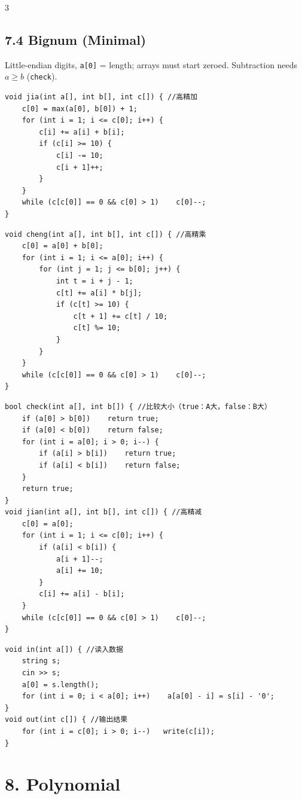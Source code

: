 \documentclass[8pt]{extarticle}
\begin{document}
\begin{multicols*}{3}
\subsection*{7.4 Bignum (Minimal)}

Little-endian digits, \texttt{a[0]} = length; arrays must start zeroed. Subtraction needs $a \ge b$ (\texttt{check}).


\begin{lstlisting}
void jia(int a[], int b[], int c[]) { //高精加
    c[0] = max(a[0], b[0]) + 1;
    for (int i = 1; i <= c[0]; i++) {
        c[i] += a[i] + b[i];
        if (c[i] >= 10) {
            c[i] -= 10;
            c[i + 1]++;
        }
    }
    while (c[c[0]] == 0 && c[0] > 1)    c[0]--;
}
\end{lstlisting}

\begin{lstlisting}
void cheng(int a[], int b[], int c[]) { //高精乘
    c[0] = a[0] + b[0];
    for (int i = 1; i <= a[0]; i++) {
        for (int j = 1; j <= b[0]; j++) {
            int t = i + j - 1;
            c[t] += a[i] * b[j];
            if (c[t] >= 10) {
                c[t + 1] += c[t] / 10;
                c[t] %= 10;
            }
        }
    }
    while (c[c[0]] == 0 && c[0] > 1)    c[0]--;
}
\end{lstlisting}

\begin{lstlisting}
bool check(int a[], int b[]) { //比较大小（true：A大，false：B大）
    if (a[0] > b[0])    return true;
    if (a[0] < b[0])    return false;
    for (int i = a[0]; i > 0; i--) {
        if (a[i] > b[i])    return true;
        if (a[i] < b[i])    return false;
    }
    return true;
}
void jian(int a[], int b[], int c[]) { //高精减
    c[0] = a[0];
    for (int i = 1; i <= c[0]; i++) {
        if (a[i] < b[i]) {
            a[i + 1]--;
            a[i] += 10;
        }
        c[i] += a[i] - b[i];
    }
    while (c[c[0]] == 0 && c[0] > 1)    c[0]--;
}
\end{lstlisting}

\begin{lstlisting}
void in(int a[]) { //读入数据
    string s;
    cin >> s;
    a[0] = s.length();
    for (int i = 0; i < a[0]; i++)    a[a[0] - i] = s[i] - '0';
}
void out(int c[]) { //输出结果
    for (int i = c[0]; i > 0; i--)   write(c[i]);
}
\end{lstlisting}

\section*{8. Polynomial}


\end{multicols*}
\end{document}
